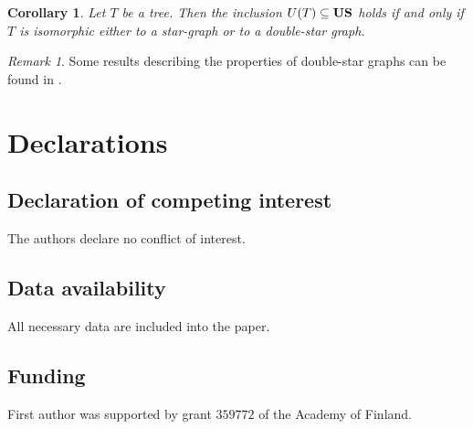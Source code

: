 \documentclass[11pt]{article}
\newtheorem{corollary}[theorem]{Corollary}
\theoremstyle{definition}
\theoremstyle{remark}
\newtheorem{remark}[theorem]{Remark}
\numberwithin{equation}{section}
\begin{document}
\begin{corollary}
    \label{xk}
Let $T$ be a tree.  
Then the inclusion $U(T) \subseteq {\bf US}$ holds if and only if $T$ is isomorphic either to a star-graph or to a double-star graph.
\end{corollary}



\begin{remark}
 Some results describing the properties of double-star graphs can be found in \cite{Akbari,Kart,Priy,Venk}.

\end{remark}
















\section*{Declarations}

\subsection*{Declaration of competing interest}

 The authors declare no conflict of interest.


\subsection*{Data availability}


 All necessary data are included into the paper.


\subsection*{Funding}

First author was supported by grant $359772$ of the Academy of Finland.\\


\end{document}

